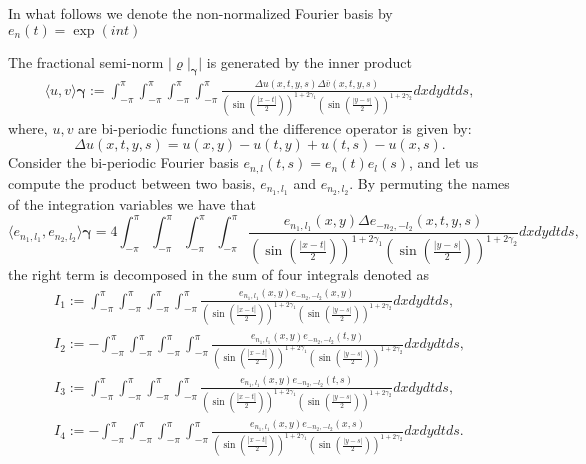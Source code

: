 \documentclass{article}
\begin{document}
In what follows we denote the non-normalized Fourier basis by $e_n(t) = \exp{(i n t) }$

The fractional semi-norm $|\varrho|_{\mathbf{\gamma}}|$ is generated by the inner product 
\begin{align*}
\langle u , v \rangle{\mathbf{\gamma}} := \int_{-\pi}^{\pi}  \int_{-\pi}^{\pi} \int_{-\pi}^{\pi}\int_{-\pi}^{\pi} \frac{\Delta u (x,t,y,s)\Delta \overline{v} (x,t,y,s) }
{\left(\sin\left(\frac{|x-t|}{2}\right)\right)^{1+2\gamma_1}\left(\sin\left(\frac{|y-s|}{2}\right)\right)^{1+2\gamma_2}}dx dy dt ds, 
\end{align*}
where, $u,v$ are bi-periodic functions and the difference operator is given by:
$$\Delta u(x,t,y,s) = u(x,y)-u(t,y)+u(t,s)-u(x,s).$$
Consider the bi-periodic Fourier basis 
$e_{n,l}(t,s) = e_n(t)e_l(s)$, and let us compute the product between two basis, $e_{n_1,l_1}$ and $e_{n_2,l_2}$.  By permuting the names of the integration variables we have that 
$$\langle e_{n_1,l_1} , e_{n_2,l_2} \rangle{\mathbf{\gamma}}  =
4 \int_{-\pi}^{\pi}  \int_{-\pi}^{\pi} \int_{-\pi}^{\pi}\int_{-\pi}^{\pi} \frac{e_{n_1,l_1}(x,y)\Delta e_{-n_2,-l_2} (x,t,y,s) }
{\left(\sin\left(\frac{|x-t|}{2}\right)\right)^{1+2\gamma_1}\left(\sin\left(\frac{|y-s|}{2}\right)\right)^{1+2\gamma_2}}dx dy dt ds, 
$$
the right term is decomposed in the sum of four integrals denoted as
\begin{align*}
I_1 := \int_{-\pi}^{\pi}\int_{-\pi}^{\pi} \int_{-\pi}^{\pi}\int_{-\pi}^{\pi} \frac{e_{n_1,l_1}(x,y)e_{-n_2,-l_2} (x,y) }
{\left(\sin\left(\frac{|x-t|}{2}\right)\right)^{1+2\gamma_1}\left(\sin\left(\frac{|y-s|}{2}\right)\right)^{1+2\gamma_2}}dx dy dt ds,\\
I_2 :=  -\int_{-\pi}^{\pi}\int_{-\pi}^{\pi} \int_{-\pi}^{\pi}\int_{-\pi}^{\pi} \frac{e_{n_1,l_1}(x,y)e_{-n_2,-l_2} (t,y) }
{\left(\sin\left(\frac{|x-t|}{2}\right)\right)^{1+2\gamma_1}\left(\sin\left(\frac{|y-s|}{2}\right)\right)^{1+2\gamma_2}}dx dy dt ds,\\
I_3 := \int_{-\pi}^{\pi}\int_{-\pi}^{\pi} \int_{-\pi}^{\pi}\int_{-\pi}^{\pi} \frac{e_{n_1,l_1}(x,y)e_{-n_2,-l_2} (t,s) }
{\left(\sin\left(\frac{|x-t|}{2}\right)\right)^{1+2\gamma_1}\left(\sin\left(\frac{|y-s|}{2}\right)\right)^{1+2\gamma_2}}dx dy dt ds,\\
I_4 := -\int_{-\pi}^{\pi}\int_{-\pi}^{\pi} \int_{-\pi}^{\pi}\int_{-\pi}^{\pi} \frac{e_{n_1,l_1}(x,y)e_{-n_2,-l_2} (x,s) }
{\left(\sin\left(\frac{|x-t|}{2}\right)\right)^{1+2\gamma_1}\left(\sin\left(\frac{|y-s|}{2}\right)\right)^{1+2\gamma_2}}dx dy dt ds.
\end{align*}
\end{document}
